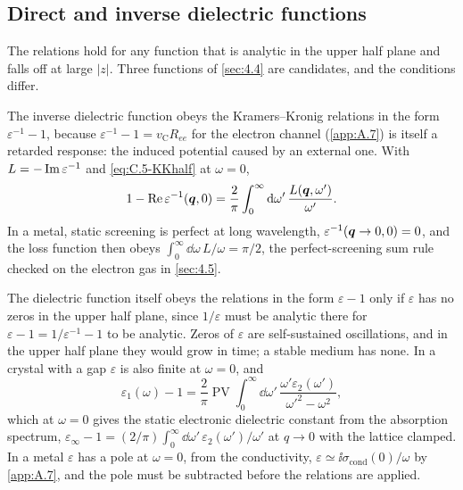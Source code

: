 \subsection{Direct and inverse dielectric functions}

The relations hold for any function that is analytic in the upper half plane and falls off at large $|z|$. Three functions of \cref{sec:4.4} are candidates, and the conditions differ.

The inverse dielectric function obeys the Kramers--Kronig relations in the form $\varepsilon^{-1} - 1$, because $\varepsilon^{-1} - 1 = v_{\mathrm{C}} R_{ee}$ for the electron channel (\cref{app:A.7}) is itself a retarded response: the induced potential caused by an external one. With $L = -\operatorname{Im}\varepsilon^{-1}$ and \cref{eq:C.5-KKhalf} at $\omega = 0$,
\begin{equation}
  1 - \operatorname{Re}\varepsilon^{-1}(\bm{q}, 0) = \frac{2}{\pi}\int_0^\infty\mathrm{d}\omega'\,\frac{L(\bm{q},\omega')}{\omega'} .
  \label{eq:C.5-screening}
\end{equation}
In a metal, static screening is perfect at long wavelength, $\varepsilon^{-1}(\bm{q}\to0, 0) = 0$, and the loss function then obeys $\int_0^\infty\dd\omega\,L/\omega = \pi/2$, the perfect-screening sum rule checked on the electron gas in \cref{sec:4.5}.

The dielectric function itself obeys the relations in the form $\varepsilon - 1$ only if $\varepsilon$ has no zeros in the upper half plane, since $1/\varepsilon$ must be analytic there for $\varepsilon - 1 = 1/\varepsilon^{-1} - 1$ to be analytic. Zeros of $\varepsilon$ are self-sustained oscillations, and in the upper half plane they would grow in time; a stable medium has none. In a crystal with a gap $\varepsilon$ is also finite at $\omega = 0$, and
\begin{equation}
  \varepsilon_1(\omega) - 1 = \frac{2}{\pi}\operatorname{PV}\!\int_0^\infty\dd\omega'\,\frac{\omega'\varepsilon_2(\omega')}{\omega'^2 - \omega^2} ,
  \label{eq:C.5-KKeps}
\end{equation}
which at $\omega = 0$ gives the static electronic dielectric constant from the absorption spectrum, $\varepsilon_\infty - 1 = (2/\pi)\int_0^\infty\dd\omega'\,\varepsilon_2(\omega')/\omega'$ at $q \to 0$ with the lattice clamped. In a metal $\varepsilon$ has a pole at $\omega = 0$, from the conductivity, $\varepsilon \simeq \ii\sigma_{\mathrm{cond}}(0)/\omega$ by \cref{app:A.7}, and the pole must be subtracted before the relations are applied.

